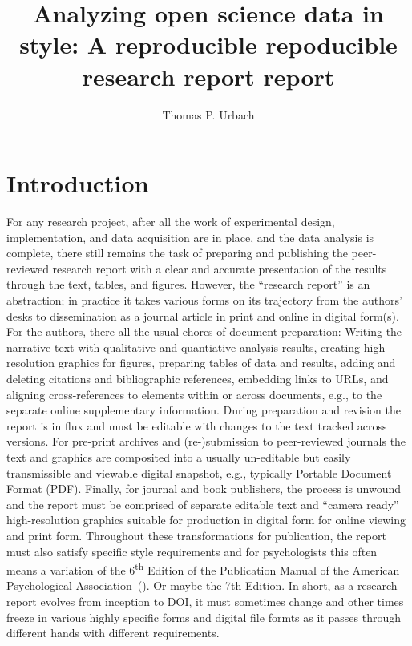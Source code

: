 \documentclass[helv,10pt,man,floatsintext]{apa6}  %
\title{Analyzing open science data in style: A reproducible repoducible research report report}
\author{Thomas P. Urbach}
\affiliation{
  Cognitive Science Department \\
  University of California, San Diego \\
  \today
}
\begin{document}
\maketitle

\section{Introduction}

For any research project, after all the work of experimental design,
implementation, and data acquisition are in place, and the data
analysis is complete, there still remains the task of preparing and
publishing the peer-reviewed research report with a clear and accurate
presentation of the results through the text, tables, and
figures. However, the ``research report'' is an abstraction; in
practice it takes various forms on its trajectory from the authors'
desks to dissemination as a journal article in print and online in
digital form(s). For the authors, there all the usual chores of
document preparation: Writing the narrative text with qualitative and
quantiative analysis results, creating high-resolution graphics for
figures, preparing tables of data and results, adding and deleting
citations and bibliographic references, embedding links to URLs, and
aligning cross-references to elements within or across documents,
e.g., to the separate online supplementary information. During
preparation and revision the report is in flux and must be editable
with changes to the text tracked across versions.  For pre-print
archives and (re-)submission to peer-reviewed journals the text and
graphics are composited into a usually un-editable but easily
transmissible and viewable digital snapshot, e.g., typically Portable
Document Format (PDF). Finally, for journal and book publishers, the
process is unwound and the report must be comprised of separate
editable text and ``camera ready'' high-resolution graphics suitable
for production in digital form for online viewing and print
form. Throughout these transformations for publication, the report
must also satisfy specific style requirements and for psychologists
this often means a variation of the 6\textsuperscript{th} Edition of
the Publication Manual of the American Psychological
Association~(\cite{APAStyle6th}). Or maybe the 7th Edition. In short,
as a research report evolves from inception to DOI, it must sometimes
change and other times freeze in various highly specific forms and
digital file formts as it passes through different hands with
different requirements.
\end{document}
